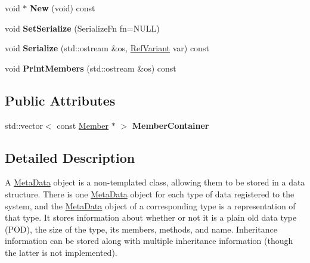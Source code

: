 \begin{DoxyCompactItemize}
\item 
\hypertarget{classDCEngine_1_1MetaData_a11d1ef4eb5ad03bde273c00f4078ec27}{void $\ast$ {\bfseries New} (void) const }\label{classDCEngine_1_1MetaData_a11d1ef4eb5ad03bde273c00f4078ec27}

\item 
\hypertarget{classDCEngine_1_1MetaData_a6c55ebf3aa72651250c0a476a81c3d74}{void {\bfseries Set\-Serialize} (Serialize\-Fn fn=N\-U\-L\-L)}\label{classDCEngine_1_1MetaData_a6c55ebf3aa72651250c0a476a81c3d74}

\item 
\hypertarget{classDCEngine_1_1MetaData_ab9f13a8fa30b98f236e47e7ff34b91dd}{void {\bfseries Serialize} (std\-::ostream \&os, \hyperlink{classDCEngine_1_1RefVariant}{Ref\-Variant} var) const }\label{classDCEngine_1_1MetaData_ab9f13a8fa30b98f236e47e7ff34b91dd}

\item 
\hypertarget{classDCEngine_1_1MetaData_a5cca31494125e0e0e847438924ce0b7f}{void {\bfseries Print\-Members} (std\-::ostream \&os) const }\label{classDCEngine_1_1MetaData_a5cca31494125e0e0e847438924ce0b7f}

\end{DoxyCompactItemize}
\subsection*{Public Attributes}
\begin{DoxyCompactItemize}
\item 
\hypertarget{classDCEngine_1_1MetaData_a873a7573e28a2c8f1115638d75a73a18}{std\-::vector$<$ const \hyperlink{classDCEngine_1_1Member}{Member} $\ast$ $>$ {\bfseries Member\-Container}}\label{classDCEngine_1_1MetaData_a873a7573e28a2c8f1115638d75a73a18}

\end{DoxyCompactItemize}


\subsection{Detailed Description}
A \hyperlink{classDCEngine_1_1MetaData}{Meta\-Data} object is a non-\/templated class, allowing them to be stored in a data structure. There is one \hyperlink{classDCEngine_1_1MetaData}{Meta\-Data} object for each type of data registered to the system, and the \hyperlink{classDCEngine_1_1MetaData}{Meta\-Data} object of a corresponding type is a representation of that type. It stores information about whether or not it is a plain old data type (P\-O\-D), the size of the type, its members, methods, and name. Inheritance information can be stored along with multiple inheritance information (though the latter is not implemented). 

